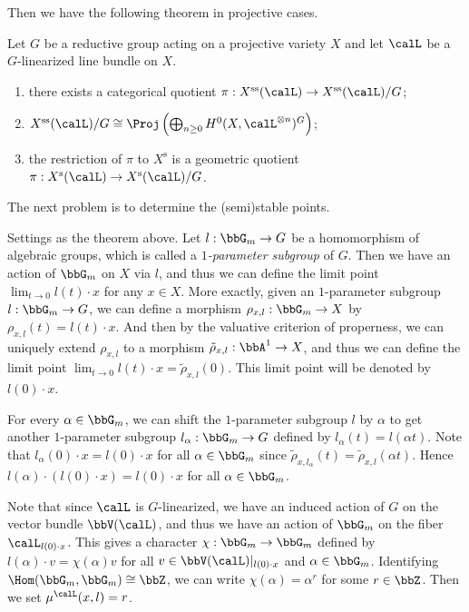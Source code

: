 Then we have the following theorem in projective cases.

\begin{theorem}
	Let $G$ be a reductive group acting on a projective variety $X$ and let $\calL$ be a $G$-linearized line bundle on $X$.
	\begin{enumerate}
		\item there exists a categorical quotient $\pi: X^{\text{ss}}(\calL) \to X^{\text{ss}}(\calL) / G$;
		\item $X^{\text{ss}}(\calL) / G \cong \Proj \left( \bigoplus_{n \geq 0} H^0(X, \calL^{\otimes n})^G \right)$;
		\item the restriction of $\pi$ to $X^{\text{s}}$ is a geometric quotient $\pi: X^{\text{s}}(\calL) \to X^{\text{s}}(\calL) / G$.
	\end{enumerate}
\end{theorem}

The next problem is to determine the (semi)stable points.

\begin{construction}
	Settings as the theorem above.
	Let $l: \bbG_m \to G$ be a homomorphism of algebraic groups, which is called a \emph{$1$-parameter subgroup} of $G$.
	Then we have an action of $\bbG_m$ on $X$ via $l$, and thus we can define the limit point $\lim_{t \to 0} l(t) \cdot x$ for any $x \in X$.
	More exactly, given an $1$-parameter subgroup $l: \bbG_m \to G$, we can define a morphism $\rho_{x, l}: \bbG_m \to X$ by $\rho_{x, l}(t) = l(t) \cdot x$.
	And then by the valuative criterion of properness, we can uniquely extend $\rho_{x, l}$ to a morphism $\tilde{\rho}_{x, l}: \bbA^1 \to X$, and thus we can define the limit point $\lim_{t \to 0} l(t) \cdot x = \tilde{\rho}_{x, l}(0)$.
	This limit point will be denoted by $l(0) \cdot x$.

	For every $\alpha \in \bbG_m$, we can shift the $1$-parameter subgroup $l$ by $\alpha$ to get another $1$-parameter subgroup $l_\alpha: \bbG_m \to G$ defined by $l_\alpha(t) = l(\alpha t)$.
	Note that $l_\alpha(0) \cdot x = l(0) \cdot x$ for all $\alpha \in \bbG_m$ since $\tilde{\rho}_{x, l_\alpha}(t) = \tilde{\rho}_{x, l}(\alpha t)$.
	Hence $l(\alpha) \cdot (l(0) \cdot x) = l(0) \cdot x$ for all $\alpha \in \bbG_m$.

	Note that since $\calL$ is $G$-linearized, we have an induced action of $G$ on the vector bundle $\bbV(\calL)$, and thus we have an action of $\bbG_m$ on the fiber $\calL_{l(0) \cdot x}$.
	This gives a character $\chi: \bbG_m \to \bbG_m$ defined by $l(\alpha) \cdot v = \chi(\alpha) v$ for all $v \in \bbV(\calL)|_{l(0)\cdot x}$ and $\alpha \in \bbG_m$.
	Identifying $\Hom(\bbG_m, \bbG_m) \cong \bbZ$, we can write $\chi(\alpha) = \alpha^r$ for some $r \in \bbZ$.
	Then we set $\mu^\calL(x, l) = r$.
\end{construction}

